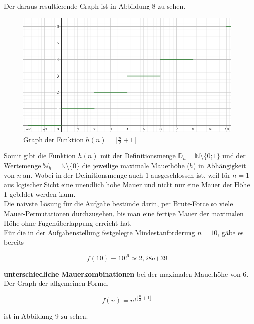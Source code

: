 \documentclass[a4paper,12pt]{article}
\begin{document}
Der daraus resultierende Graph ist in Abbildung 8 zu sehen.
\begin{figure}[H]
    \centering
    \includegraphics[width=0.95\linewidth]{Bilder/Aufgabe1/Graph_02.png}
    \caption{Graph der Funktion $h(n) = \lfloor\frac{n}{2}+1\rfloor$}
\end{figure}
Somit gibt die Funktion $h(n)$ mit der Definitionsmenge $\mathbb{D}_{h} = \mathbb{N}$\textbackslash$\{0;1\}$ und der Wertemenge $\mathbb{W}_{h} = \mathbb{N}$\textbackslash$\{0\}$ die jeweilige maximale Mauerhöhe ($h$) in Abhängigkeit von $n$ an. Wobei in der Definitionsmenge auch $1$ ausgeschlossen ist, weil für $n = 1$ aus logischer Sicht eine unendlich hohe Mauer und nicht nur eine Mauer der Höhe 1 gebildet werden kann.
\\[0.4cm]
Die naivste Lösung für die Aufgabe bestünde darin, per Brute-Force so viele Mauer-Permutationen durchzugehen, bis man eine fertige Mauer der maximalen Höhe ohne Fugenüberlappung erreicht hat.
\\[0.4cm]
Für die in der Aufgabenstellung festgelegte Mindestanforderung $n = 10$, gäbe es bereits
\begin{center}
\begin{Large}
\[f(10) = 10!^6\approx2,28\mathrm{e}{+39}\]
\end{Large}
\end{center}
\textbf{unterschiedliche Mauerkombinationen} bei der maximalen Mauerhöhe von 6.
Der Graph der allgemeinen Formel
\begin{center}
\begin{Large}
\[f(n) = n!^{\lfloor\frac{n}{2}+1\rfloor}\]
\end{Large}
\end{center}
ist in Abbildung 9 zu sehen.
\end{document}
